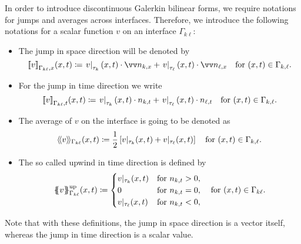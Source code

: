 \documentclass[../thesis.tex]{subfiles}
\begin{document}
In order to introduce discontinuous Galerkin bilinear forms, we require notations for jumps and averages across interfaces.
Therefore, we introduce the following notations for a scalar function $v$ on an interface $\Gamma_{k \ell}$:
\begin{itemize}
\item The jump in space direction will be denoted by
\[
	\ljump v \rjump_{\Gamma_{k \ell}, x} (x, t) \coloneqq \left. v \right|_{\tau_k} (x, t) \cdot \markvec{n_{k, x}} + \left. v \right|_{\tau_\ell} (x, t) \cdot \markvec{n_{\ell, x}} \quad \text{for } (x, t) \in \Gamma_{k, \ell}.
\]
\item For the jump in time direction we write
\[
	{\lbrack\!\lbrack} v {\rbrack\!\rbrack}_{\Gamma_{k \ell}, t} (x, t) \coloneqq \left. v \right|_{\tau_k} (x, t) \cdot n_{k, t} + \left. v \right|_{\tau_\ell} (x, t) \cdot  n_{\ell, t} \quad \text{for } (x, t) \in \Gamma_{k, \ell}.
\]
\item The average of $v$ on the interface is going to be denoted as
\[
	\langle\!\langle v \rangle\!\rangle_{\Gamma_{k \ell}} (x, t) \coloneqq \frac{1}{2} \left[ v|_{\tau_k} (x, t) + v|_{\tau_\ell}(x, t) \right] \quad \text{for } (x, t) \in \Gamma_{k, \ell}.
\]
\item The so called upwind in time direction is defined by
\[
	{\{\!\!\{} v {\}\!\!\}}^{\mathrm{up}}_{\Gamma_{k \ell}} (x, t) \coloneqq \begin{cases}
	v|_{\tau_k}(x, t) & \text{for } n_{k, t} > 0, \\
	0 & \text{for } n_{k, t} = 0,\\
	v|_{\tau_\ell}(x, t) & \text{for } n_{k, t} < 0,
	\end{cases} \quad \text{for } (x, t) \in \Gamma_{k \ell}.
\]
\end{itemize}
Note that with these definitions, the jump in space direction is a vector itself, whereas the jump in time direction is a scalar value.
\end{document}
